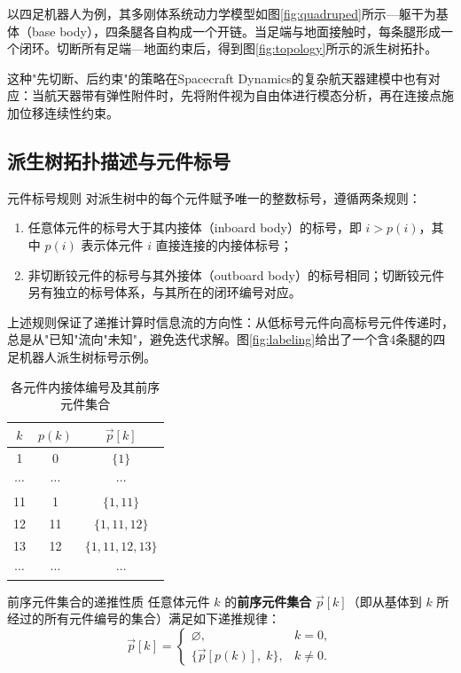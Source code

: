 \documentclass[10pt,a4paper]{book}
\theoremstyle{thmstyle}
\theoremstyle{defstyle}
\theoremstyle{prostyle}
\begin{document}
以四足机器人为例，其多刚体系统动力学模型如图\ref{fig:quadruped}所示---躯干为基体（base body），四条腿各自构成一个开链。当足端与地面接触时，每条腿形成一个闭环。切断所有足端—地面约束后，得到图\ref{fig:topology}所示的派生树拓扑。

\medskip
\noindent 这种"先切断、后约束"的策略在Spacecraft Dynamics的复杂航天器建模中也有对应：当航天器带有弹性附件时，先将附件视为自由体进行模态分析，再在连接点施加位移连续性约束。

\subsection{派生树拓扑描述与元件标号}

\begin{mydefinition}{元件标号规则}
对派生树中的每个元件赋予唯一的整数标号，遵循两条规则：
\begin{enumerate}
    \item 任意体元件的标号大于其内接体（inboard body）的标号，即 $i > p(i)$，其中 $p(i)$ 表示体元件 $i$ 直接连接的内接体标号；
    \item 非切断铰元件的标号与其外接体（outboard body）的标号相同；切断铰元件另有独立的标号体系，与其所在的闭环编号对应。
\end{enumerate}
\end{mydefinition}

上述规则保证了递推计算时信息流的方向性：从低标号元件向高标号元件传递时，总是从"已知"流向"未知"，避免迭代求解。图\ref{fig:labeling}给出了一个含4条腿的四足机器人派生树标号示例。

\begin{table}[H]
\centering
\caption{各元件内接体编号及其前序元件集合}
\label{tab:preorder}
\begin{tabular}{c|c|c}
\toprule
$k$ & $p(k)$ & $\overrightarrow{p}[k]$ \\
\midrule
1 & 0 & $\{1\}$ \\
$\cdots$ & $\cdots$ & $\cdots$ \\
11 & 1 & $\{1,11\}$ \\
12 & 11 & $\{1,11,12\}$ \\
13 & 12 & $\{1,11,12,13\}$ \\
$\cdots$ & $\cdots$ & $\cdots$ \\
\bottomrule
\end{tabular}
\end{table}

\begin{myTheorem}{前序元件集合的递推性质}
任意体元件 $k$ 的\textbf{前序元件集合} $\overrightarrow{p}[k]$（即从基体到 $k$ 所经过的所有元件编号的集合）满足如下递推规律：
\begin{equation}
\overrightarrow{p}[k] =
\begin{cases}
\varnothing, & k = 0,\\[4pt]
\{\overrightarrow{p}[p(k)],\; k\}, & k \neq 0.
\end{cases}
\label{eq:preorder}
\end{equation}
\end{myTheorem}
\end{document}
